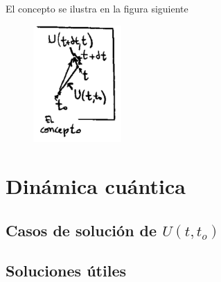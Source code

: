 \documentclass[10pt,oneside]{CBFT_book}
\begin{document}
El concepto se ilustra en la figura siguiente
\begin{figure}[htb]
	\begin{center}
	\includegraphics[width=0.3\textwidth]{images/teo2_5.pdf}	 
	\end{center}
	\caption{}
\end{figure} 



\section{Dinámica cuántica}

% 
% 

\subsection{Casos de solución de $U(t,t_o)$}

\subsection{Soluciones útiles}
\end{document}
